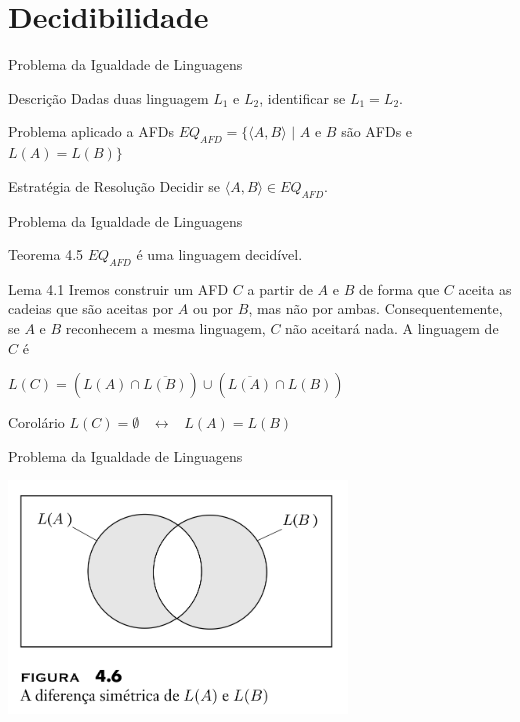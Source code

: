 \documentclass[xcolor=dvipsnames,table]{beamer}
\begin{document}
	\section{Decidibilidade}
	
	\begin{frame}{Problema da Igualdade de Linguagens}
		\begin{block}{Descrição}
			Dadas duas linguagem $L_1$ e $L_2$, identificar se $L_1 = L_2$.
		\end{block}	\pause
		\begin{block}{Problema aplicado a AFDs}
			$EQ_{AFD} = \{ \langle A, B \rangle \mbox{ | } A$ e $B$ são AFDs e $L(A) = L(B) \}$
		\end{block} \pause
		\begin{block}{Estratégia de Resolução}
			Decidir se $\langle A, B \rangle \in EQ_{AFD}$.
		\end{block}
	\end{frame}		
	
	\begin{frame}{Problema da Igualdade de Linguagens}
		\begin{block}{Teorema 4.5}
			$EQ_{AFD}$ é uma linguagem decidível.
		\end{block} \pause
		\begin{block}{Lema 4.1}
			Iremos construir um AFD $C$ a partir de $A$ e $B$ de forma que $C$ aceita as cadeias que são aceitas por $A$ ou por $B$, mas não por ambas. Consequentemente, se $A$ e $B$ reconhecem a mesma linguagem, $C$ não aceitará nada. A linguagem de $C$ é
			\begin{center}
				$L(C) = \left( L(A) \cap \overline{L(B)} \right) \cup \left( \overline{L(A)} \cap L(B) \right)$
			\end{center}
		\end{block} \pause
		\begin{block}{Corolário}
			$L(C) = \emptyset$ \ $\leftrightarrow$ \ $L(A) = L(B)$
		\end{block}
	\end{frame}
	
	\begin{frame}{Problema da Igualdade de Linguagens}
		\begin{center}
			\includegraphics[width=9cm]{images/fig46.png}
		\end{center}
	\end{frame}
	
\end{document}
